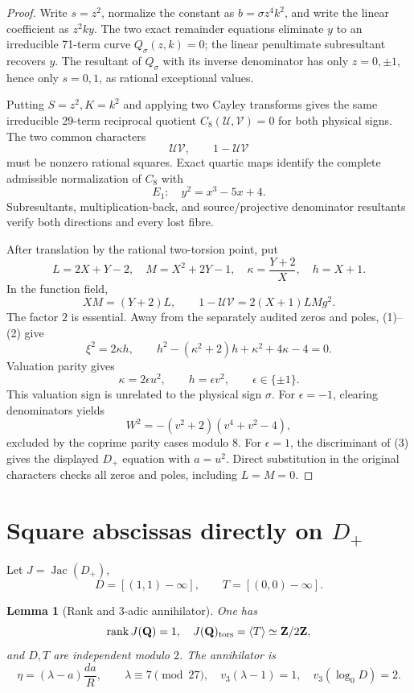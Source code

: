\documentclass[11pt]{article}
\newtheorem{lemma}[theorem]{Lemma}
\newcommand{\Q}{\mathbf Q}
\begin{document}
\begin{proof}
Write \(s=z^2\), normalize the constant as \(b=\sigma z^4k^2\), and write
the linear coefficient as \(z^2ky\).  The two exact remainder equations
eliminate \(y\) to an irreducible 71-term curve \(Q_\sigma(z,k)=0\); the
linear penultimate subresultant recovers \(y\).  The resultant of
\(Q_\sigma\) with its inverse denominator has only
\(z=0,\pm1\), hence only \(s=0,1\), as rational exceptional values.

Putting \(S=z^2,K=k^2\) and applying two Cayley transforms gives the same
irreducible 29-term reciprocal quotient \(C_8(\mathcal U,\mathcal V)=0\)
for both physical signs.  The two common characters
\[
 \mathcal U\mathcal V,\qquad1-\mathcal U\mathcal V                 \tag{1}
\]
must be nonzero rational squares.  Exact quartic maps identify the complete
admissible normalization of \(C_8\) with
\[
 E_1:\quad y^2=x^3-5x+4.
\]
Subresultants, multiplication-back, and source/projective denominator
resultants verify both directions and every lost fibre.

After translation by the rational two-torsion point, put
\[
 L=2X+Y-2,\quad M=X^2+2Y-1,\quad
 \kappa=\frac{Y+2}{X},\quad h=X+1.
\]
In the function field,
\[
 XM=(Y+2)L,\qquad
 1-\mathcal U\mathcal V=2(X+1)LMg^2.               \tag{2}
\]
The factor \(2\) is essential.  Away from the separately audited
zeros and poles, (1)--(2) give
\[
 \xi^2=2\kappa h,\qquad
 h^2-(\kappa^2+2)h+\kappa^2+4\kappa-4=0.           \tag{3}
\]
Valuation parity gives
\[
 \kappa=2\epsilon u^2,\qquad h=\epsilon v^2,
 \qquad\epsilon\in\{\pm1\}.
\]
This valuation sign is unrelated to the physical sign \(\sigma\).
For \(\epsilon=-1\), clearing denominators yields
\[
 W^2=-(v^2+2)(v^4+v^2-4),
\]
excluded by the coprime parity cases modulo \(8\).  For \(\epsilon=1\),
the discriminant of (3) gives the displayed \(D_+\) equation with
\(a=u^2\).  Direct substitution in the original characters checks all
zeros and poles, including \(L=M=0\).
\end{proof}

\section{Square abscissas directly on \(D_+\)}

Let \(J=\operatorname{Jac}(D_+)\),
\[
 D=[(1,1)-\infty],\qquad T=[(0,0)-\infty].
\]

\begin{lemma}[Rank and \(3\)-adic annihilator]\label{lem:ann}
One has
\[
 \operatorname{rank}J(\Q)=1,\quad
 J(\Q)_{\rm tors}=\langle T\rangle\simeq\mathbf Z/2\mathbf Z,
\]
and \(D,T\) are independent modulo \(2\).  The annihilator is
\[
 \eta=(\lambda-a)\frac{da}{R},\qquad
 \lambda\equiv7\pmod{27},\quad v_3(\lambda-1)=1,\quad
 v_3(\log_0D)=2.                                    \tag{4}
\]
\end{lemma}
\end{document}
